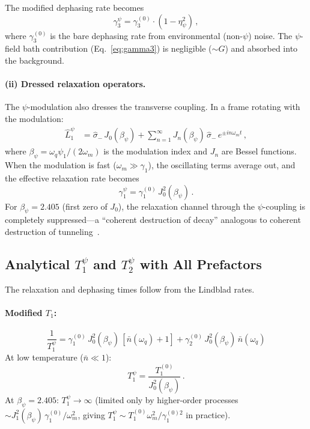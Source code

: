 \documentclass[aps,prl,twocolumn,superscriptaddress,nofootinbib,longbibliography]{revtex4-2}
\begin{document}
The modified dephasing rate becomes
\begin{equation}\label{eq:gamma3-mod}
\gamma_3^\psi = \gamma_3^{(0)}\cdot(1 - \eta_\psi^2)\,,
\end{equation}
where $\gamma_3^{(0)}$ is the bare dephasing rate from environmental
(non-$\psi$) noise. The $\psi$-field bath contribution
(Eq.~\ref{eq:gamma3}) is negligible ($\sim G$) and absorbed into the
background.

\paragraph{(ii) Dressed relaxation operators.}
The $\psi$-modulation also dresses the transverse coupling. In a frame
rotating with the modulation:
\begin{align}
\hat{L}_1^\psi &= \hat{\sigma}_-\,J_0(\beta_\psi) +
\sum_{n=1}^{\infty} J_n(\beta_\psi)\,\hat{\sigma}_-\,
e^{\pm in\omega_m t}\,, \label{eq:L1-mod}
\end{align}
where $\beta_\psi = \omega_q\psi_1/(2\omega_m)$ is the modulation index
and $J_n$ are Bessel functions. When the modulation is fast
($\omega_m \gg \gamma_1$), the oscillating terms average out, and the
effective relaxation rate becomes
\begin{equation}\label{eq:gamma1-mod}
\gamma_1^\psi = \gamma_1^{(0)}\,J_0^2(\beta_\psi)\,.
\end{equation}
For $\beta_\psi = 2.405$ (first zero of $J_0$), the relaxation channel
through the $\psi$-coupling is completely suppressed---a ``coherent
destruction of decay'' analogous to coherent destruction of
tunneling~\cite{Grossmann1991}.

\subsection{Analytical $T_1^\psi$ and $T_2^\psi$ with All Prefactors}

The relaxation and dephasing times follow from the Lindblad rates.

\paragraph{Modified $T_1$:}
\begin{equation}\label{eq:T1-psi}
\boxed{
\frac{1}{T_1^\psi} = \gamma_1^{(0)}\,J_0^2(\beta_\psi)\,
[\bar{n}(\omega_q) + 1] + \gamma_2^{(0)}\,J_0^2(\beta_\psi)\,
\bar{n}(\omega_q)
}
\end{equation}
At low temperature ($\bar{n} \ll 1$):
\begin{equation}
T_1^\psi = \frac{T_1^{(0)}}{J_0^2(\beta_\psi)}\,.
\end{equation}
At $\beta_\psi = 2.405$: $T_1^\psi \to \infty$ (limited only by
higher-order processes $\sim J_1^2(\beta_\psi)\,\gamma_1^{(0)}
/\omega_m^2$, giving $T_1^\psi \sim T_1^{(0)}\omega_m^2/\gamma_1^{(0)2}$
in practice).
\end{document}
